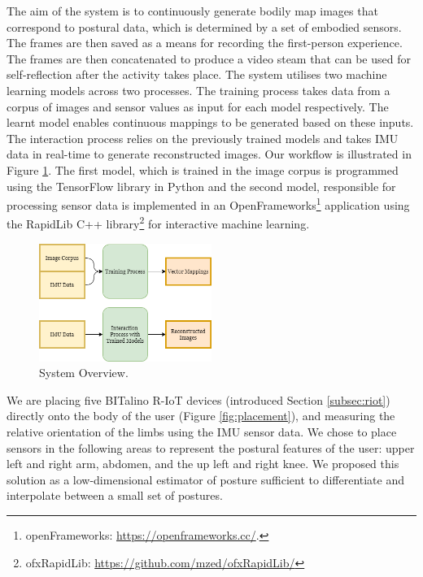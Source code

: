 The aim of the system is to continuously generate bodily map images that correspond to postural data, which is determined by a set of embodied sensors. The frames are then saved as a means for recording the first-person experience. The frames are then concatenated to produce a video steam that can be used for self-reflection after the activity takes place. The system utilises two machine learning models across two processes. The training process takes data from a corpus of images and sensor values as input for each model respectively. The learnt model enables continuous mappings to be generated based on these inputs. The interaction process relies on the previously trained models and takes IMU data in real-time to generate reconstructed images. Our workflow is illustrated in Figure \ref{fig:system_overview}. The first model, which is trained in the image corpus is programmed using the TensorFlow library \cite{abadi_tensorflow_2016} in Python and the second model, responsible for processing sensor data is implemented in an OpenFrameworks\footnote{openFrameworks: \url{https://openframeworks.cc/}.} application using the RapidLib C++ library\footnote{ofxRapidLib: \url{https://github.com/mzed/ofxRapidLib/}} for interactive machine learning.

\begin{figure}[ht]
    \centering
    \includegraphics[width=0.5\textwidth]{Chapters/Figures/modi_dis/Latent-Steps-Architecture.png}
    \caption{System Overview.}
    \label{fig:system_overview}
\end{figure}


We are placing five BITalino R-IoT devices (introduced Section \ref{subsec:riot}) directly onto the body of the user (Figure \ref{fig:placement}), and measuring the relative orientation of the limbs using the IMU sensor data. We chose to place sensors in the following areas to represent the postural features of the user: upper left and right arm, abdomen, and the up left and right knee. We proposed this solution as a low-dimensional estimator of posture sufficient to differentiate and interpolate between a small set of postures.

